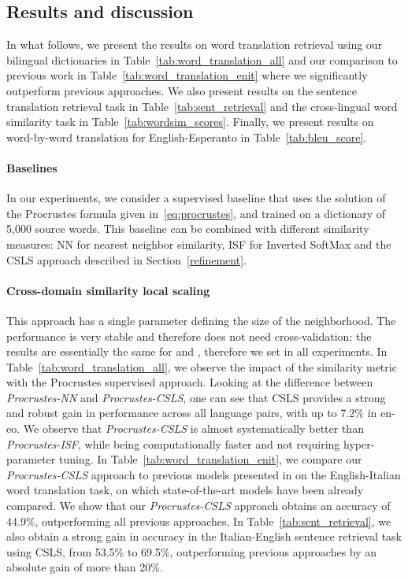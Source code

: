 \documentclass{article} \usepackage{iclr2018_conference,times}
\newcommand{\hub}{CSLS\xspace}
\newcommand{\isf}{ISF\xspace}
\begin{document}
\subsection{Results and discussion}


In what follows, we present the results on word translation retrieval using our bilingual dictionaries in Table~\ref{tab:word_translation_all} and our comparison to previous work in Table~\ref{tab:word_translation_enit} where we significantly outperform previous approaches. We also present results on the sentence translation retrieval task in Table~\ref{tab:sent_retrieval} and the cross-lingual word similarity task in Table~\ref{tab:wordsim_scores}. Finally, we present results on word-by-word translation for English-Esperanto in Table~\ref{tab:bleu_score}.

\insertwordtranslationenit


\paragraph{Baselines}
In our experiments, we consider a supervised baseline that uses the solution of the Procrustes formula given in~\eqref{eq:procrustes}, and trained on a dictionary of 5,000 source words. This baseline can be combined with different similarity measures: NN for nearest neighbor similarity, \isf for Inverted SoftMax and the \hub approach described in Section~\ref{refinement}.


\paragraph{Cross-domain similarity local scaling} 
This approach has a single parameter  defining the size of the neighborhood. The performance is very stable and therefore  does not need cross-validation: the results are essentially the same for  and , therefore we set  in all experiments. 
In Table~\ref{tab:word_translation_all}, we observe the impact of the similarity metric with the Procrustes supervised approach. Looking at the difference between \textit{Procrustes-NN} and \textit{Procrustes-\hub}, one can see that \hub provides a strong and robust gain in performance across all language pairs, with up to 7.2\% in en-eo. We observe that \textit{Procrustes-\hub} is almost systematically better than \textit{Procrustes-\isf}, while being computationally faster and not requiring hyper-parameter tuning. In Table~\ref{tab:word_translation_enit}, we compare our \textit{Procrustes-\hub} approach to previous models presented in \cite{mikolov2013exploiting,dinu2014improving,smith2017offline,artetxe} on the English-Italian word translation task, on which state-of-the-art models have been already compared. We show that our \textit{Procrustes-\hub} approach obtains an accuracy of 44.9\%, outperforming all previous approaches. In Table~\ref{tab:sent_retrieval}, we also obtain a strong gain in accuracy in the Italian-English sentence retrieval task using \hub, from 53.5\% to 69.5\%, outperforming previous approaches by an absolute gain of more than 20\%.
\end{document}
